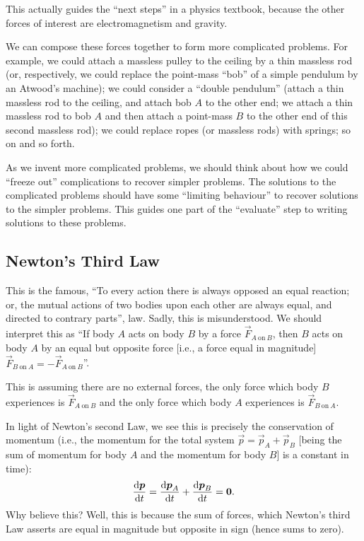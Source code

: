This actually guides the ``next steps'' in a physics textbook, because
the other forces of interest are electromagnetism and gravity.

We can compose these forces together to form more complicated problems.
For example, we could attach a massless pulley to the ceiling by a thin
massless rod (or, respectively, we could replace the point-mass ``bob''
of a simple pendulum by an Atwood's machine); we could consider a
``double pendulum'' (attach a thin massless rod to the ceiling, and
attach bob $A$ to the other end; we attach a thin massless rod to bob
$A$ and then attach a point-mass $B$ to the other end of this second
massless rod); we could replace ropes (or massless rods) with springs;
so on and so forth.

As we invent more complicated problems, we should think about how we
could ``freeze out'' complications to recover simpler problems. The
solutions to the complicated problems should have some ``limiting behaviour''
to recover solutions to the simpler problems. This guides one part of
the ``evaluate'' step to writing solutions to these problems.

\subsection{Newton's Third Law}

\M This is the famous, ``To every action there is always opposed an
equal reaction; or, the mutual actions of two bodies upon each other are
always equal, and directed to contrary parts'', law. Sadly, this is
misunderstood. We should interpret this as ``If body $A$ acts on body
$B$ by a force $\vec{F}_{A~\text{on}~B}$, then $B$ acts on body $A$ by
an equal but opposite force [i.e., a force equal in magnitude]
$\vec{F}_{B~\text{on}~A}=-\vec{F}_{A~\text{on}~B}$''.

This is assuming there are no external forces, the only force which body
$B$ experiences is $\vec{F}_{A~\text{on}~B}$ and the only force which
body $A$ experiences is $\vec{F}_{B~\text{on}~A}$.

In light of Newton's second Law, we see this is precisely the
conservation of momentum (i.e., the momentum for the total system
$\vec{p}=\vec{p}_{A} + \vec{p}_{B}$ [being the sum of momentum for body
  $A$ and the momentum for body $B$] is a constant in time):
\begin{equation}
\frac{\mathrm{d}\boldsymbol{p}}{\mathrm{d} t} = \frac{\mathrm{d}\boldsymbol{p}_{A}}{\mathrm{d} t} +
\frac{\mathrm{d}\boldsymbol{p}_{B}}{\mathrm{d} t} = \boldsymbol{0}.
\end{equation}
Why believe this? Well, this is because the sum of forces, which
Newton's third Law asserts are equal in magnitude but opposite in sign
(hence sums to zero).

